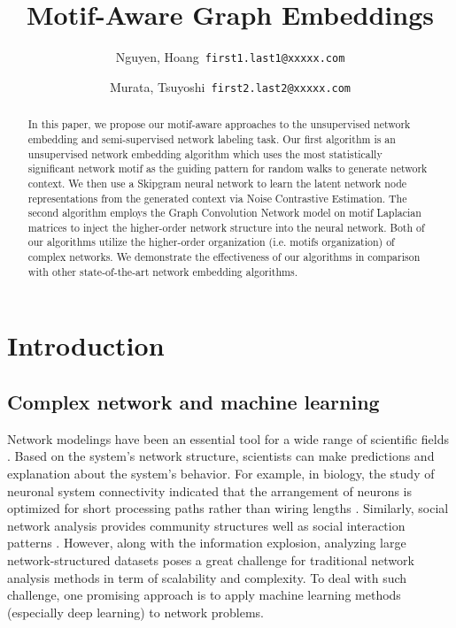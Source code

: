 \documentclass{article}
\title{Motif-Aware Graph Embeddings}
\author{
  Nguyen, Hoang\      \texttt{first1.last1@xxxxx.com}
  \and
  Murata, Tsuyoshi\      \texttt{first2.last2@xxxxx.com}
}
\theoremstyle{definition}
\begin{document}
\maketitle

\begin{abstract}

  In this paper, we propose our motif-aware approaches to the
  unsupervised network embedding and semi-supervised network labeling
  task. Our first algorithm is an unsupervised network embedding
  algorithm which uses the most statistically significant network motif
  as the guiding pattern for random walks to generate network context. We
  then use a Skipgram neural network to learn the latent network node
  representations from the generated context via Noise Contrastive
  Estimation. The second algorithm employs the Graph Convolution Network
  model on motif Laplacian matrices to inject the higher-order network
  structure into the neural network. Both of our algorithms utilize the
  higher-order organization (i.e. motifs organization) of complex
  networks. We demonstrate the effectiveness of our algorithms in
  comparison with other state-of-the-art network embedding algorithms.

\end{abstract}

\section{Introduction}

\subsection{Complex network and machine learning}

Network modelings have been an essential tool for a wide
range of scientific fields
\cite{physicnet,molecule,motifblockmilo,juremotif}.
Based on the system's network structure,
scientists can make predictions and explanation
about the system's behavior. For example, in biology, the
study of neuronal system connectivity indicated
that the arrangement of neurons is optimized
for short processing paths rather than wiring lengths
\cite{kaiser2006nonoptimal}. Similarly, social network
analysis provides community structures well as
social interaction patterns
\cite{west2014exploiting,barabasi2014network}.
However, along with the information explosion, analyzing
large network-structured datasets poses a great challenge
for traditional network analysis methods in term of
scalability and complexity. To deal with such challenge,
one promising approach is to apply machine learning methods
(especially deep learning) to network problems.
\end{document}
